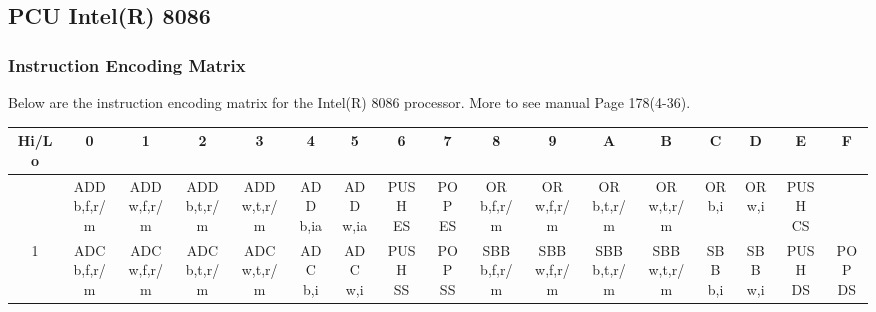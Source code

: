 

\subsection{PCU Intel(R) 8086}



\subsubsection{Instruction Encoding Matrix}

Below are the instruction encoding matrix for the Intel(R) 8086 processor. More to see manual\cite{i8086} Page 178(4-36).

{\fontsize{6pt}{6.18pt}\selectfont

\setlength{\tabcolsep}{2pt}
\begin{longtable}{|c|c|c|c|c|c|c|c|c|c|c|c|c|c|c|c|c|}
\hline
\textbf{Hi/Lo} & 0 & 1 & 2 & 3 & 4 & 5 & 6 & 7 & 8 & 9 & A & B & C & D & E & F \\
\hline
\endhead
\hline
\endfoot
\hline
\endlastfoot
0 & \makecell{ADD\\b,f,r/m} & \makecell{ADD\\w,f,r/m} & \makecell{ADD\\b,t,r/m} & \makecell{ADD\\w,t,r/m} & \makecell{ADD\\b,ia} & \makecell{ADD\\w,ia} & \makecell{PUSH\\ES} & \makecell{POP\\ES} & \makecell{OR\\b,f,r/m} & \makecell{OR\\w,f,r/m} & \makecell{OR\\b,t,r/m} & \makecell{OR\\w,t,r/m} & \makecell{OR\\b,i} & \makecell{OR\\w,i} & \makecell{PUSH\\CS} &  \\
\hline
1 & \makecell{ADC\\b,f,r/m} & \makecell{ADC\\w,f,r/m} & \makecell{ADC\\b,t,r/m} & \makecell{ADC\\w,t,r/m} & \makecell{ADC\\b,i} & \makecell{ADC\\w,i} & \makecell{PUSH\\SS} & \makecell{POP\\SS} & \makecell{SBB\\b,f,r/m} & \makecell{SBB\\w,f,r/m} & \makecell{SBB\\b,t,r/m} & \makecell{SBB\\w,t,r/m} & \makecell{SBB\\b,i} & \makecell{SBB\\w,i} & \makecell{PUSH\\DS} & \makecell{POP\\DS} \\

\end{longtable}}
